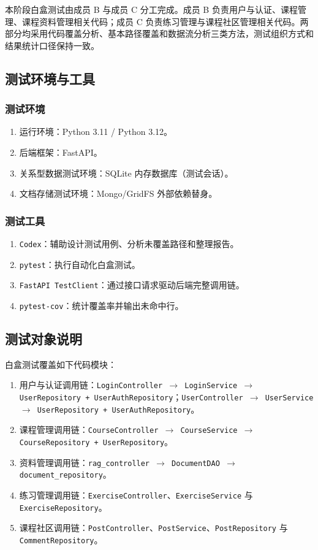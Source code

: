 \documentclass[12pt,a4paper]{ctexart}
\begin{document}
本阶段白盒测试由成员 B 与成员 C 分工完成。成员 B 负责用户与认证、课程管理、课程资料管理相关代码；成员 C 负责练习管理与课程社区管理相关代码。两部分均采用代码覆盖分析、基本路径覆盖和数据流分析三类方法，测试组织方式和结果统计口径保持一致。

\subsection{测试环境与工具}

\subsubsection{测试环境}

\begin{enumerate}
  \item 运行环境：Python 3.11 / Python 3.12。
  \item 后端框架：FastAPI。
  \item 关系型数据测试环境：SQLite 内存数据库（测试会话）。
  \item 文档存储测试环境：Mongo/GridFS 外部依赖替身。
\end{enumerate}

\subsubsection{测试工具}

\begin{enumerate}
  \item \texttt{Codex}：辅助设计测试用例、分析未覆盖路径和整理报告。
  \item \texttt{pytest}：执行自动化白盒测试。
  \item \texttt{FastAPI TestClient}：通过接口请求驱动后端完整调用链。
  \item \texttt{pytest-cov}：统计覆盖率并输出未命中行。
\end{enumerate}

\subsection{测试对象说明}

白盒测试覆盖如下代码模块：

\begin{enumerate}
  \item 用户与认证调用链：\texttt{LoginController \(\rightarrow\) LoginService \(\rightarrow\) UserRepository + UserAuthRepository}；\texttt{UserController \(\rightarrow\) UserService \(\rightarrow\) UserRepository + UserAuthRepository}。
  \item 课程管理调用链：\texttt{CourseController \(\rightarrow\) CourseService \(\rightarrow\) CourseRepository + UserRepository}。
  \item 资料管理调用链：\texttt{rag\_controller \(\rightarrow\) DocumentDAO \(\rightarrow\) document\_repository}。
  \item 练习管理调用链：\texttt{ExerciseController}、\texttt{ExerciseService} 与 \texttt{ExerciseRepository}。
  \item 课程社区调用链：\texttt{PostController}、\texttt{PostService}、\texttt{PostRepository} 与 \texttt{CommentRepository}。
\end{enumerate}
\end{document}
